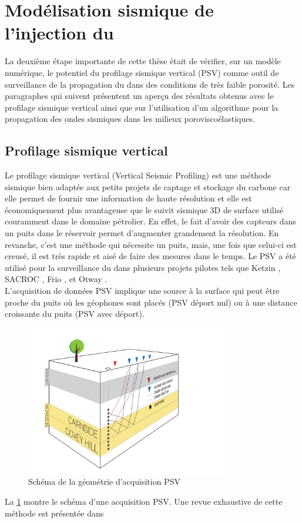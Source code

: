 \section{Modélisation sismique de l'injection du \texorpdfstring{}{CO2}}
\label{sc:model}
La deuxième étape importante de cette thèse était de vérifier, sur un modèle
numérique, le potentiel du profilage sismique vertical (PSV) comme outil de
surveillance de la propagation du  dans des conditions de très faible
porosité. Les paragraphes qui suivent présentent un aperçu des résultats obtenus
avec le profilage sismique vertical ainsi que sur l'utilisation d'un algorithme
pour la propagation des ondes sismiques dans les milieux poroviscoélastiques.
\subsection{Profilage sismique vertical}
Le profilage sismique vertical (Vertical Seismic Profiling) est une méthode
sismique bien adaptée aux petits projets de captage et stockage du carbone car elle
permet de fournir une information de haute résolution \citep{Yang2014} et elle
est économiquement plus avantageuse que le suivit sismique 3D de surface utilisé
couramment dans le domaine pétrolier. En effet, le fait d'avoir des capteurs dans
un puits dans le réservoir permet d'augmenter grandement la résolution. En
revanche, c'est une méthode qui nécessite un puits, mais, une fois que celui-ci
est creusé, il est très rapide et aisé de faire des mesures dans le temps. Le
PSV a été utilisé pour la surveillance du   dans plusieurs projets
pilotes tels que Ketzin \citep{Yang2010}, SACROC \citep{Yang2014,Cheng2010},
Frio \citep{Daley2008}, et Otway \citep{Urosevic2008}.\\
L'acquisition de données PSV implique une source à la surface qui peut être
proche du puits où les géophones sont placés (PSV déport nul) ou à une distance
croissante du puits (PSV avec déport).
\begin{figure}[ht]
\centering
\includegraphics[width=0.8\textwidth]{fig/vsp_3D.pdf}
\caption{Schéma de la géométrie d'acquisition PSV}
\label{fig:vsp_3D}
\end{figure}
La \cref{fig:vsp_3D} montre le schéma d'une acquisition PSV. Une revue
exhaustive de cette méthode est présentée dans \citep{Hardage1992,Mari2003}
